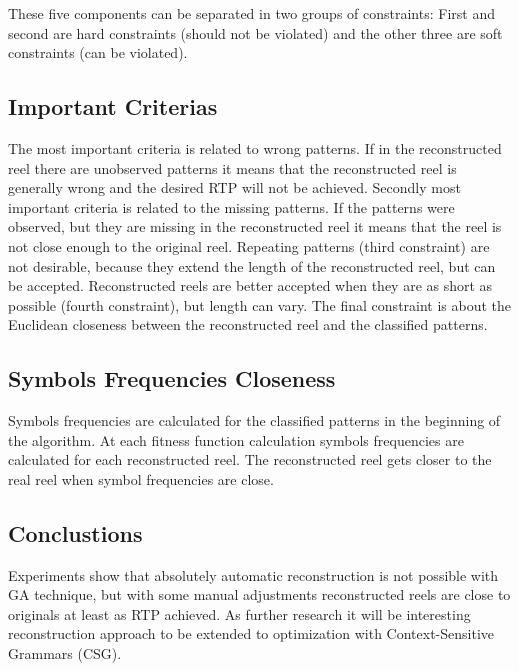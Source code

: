 \documentclass[a0,portrait,25pt]{sciposter}
\begin{document}
\begin{multicols}{3}
\begin{mdframed}[backgroundcolor=white,roundcorner=4pt,shadow=true,linewidth=1pt]
These five components can be separated in two groups of constraints: First and second are hard constraints (should not be violated) and the other three are soft constraints (can be violated). \\
\end{mdframed}

\begin{mdframed}[backgroundcolor=white,roundcorner=4pt,shadow=true,linewidth=1pt]
\color{Black}
\section*{Important Criterias}
The most important criteria is related to wrong patterns. If in the reconstructed reel there are unobserved patterns it means that the reconstructed reel is generally wrong and the desired RTP will not be achieved. Secondly most important criteria is related to the missing patterns. If the patterns were observed, but they are missing in the reconstructed reel it means that the reel is not close enough to the original reel. Repeating patterns (third constraint) are not desirable, because they extend the length of the reconstructed reel, but can be accepted. Reconstructed reels are better accepted when they are as short as possible (fourth constraint), but length can vary. The final constraint is about the Euclidean closeness between the reconstructed reel and the classified patterns. 
\end{mdframed}

\begin{mdframed}[backgroundcolor=white,roundcorner=4pt,shadow=true,linewidth=1pt]
\color{Black}
\section*{Symbols Frequencies Closeness}
Symbols frequencies are calculated for the classified patterns in the beginning of the algorithm. At each fitness function calculation symbols frequencies are calculated for each reconstructed reel. The reconstructed reel gets closer to the real reel when symbol frequencies are close. 
\end{mdframed}

\begin{mdframed}[backgroundcolor=white,roundcorner=4pt,shadow=true,linewidth=1pt]
\color{Black}
\section*{Conclustions}
Experiments show that absolutely automatic reconstruction is not possible with GA technique, but with some manual adjustments reconstructed reels are close to originals at least as RTP achieved. As further research it will be interesting reconstruction approach to be extended to optimization with Context-Sensitive Grammars (CSG).
\end{mdframed}


\end{multicols}
\end{document}
